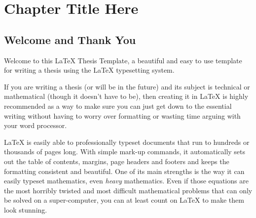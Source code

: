 
\chapter{Chapter Title Here} %
\label{Chapter1} %



\newcommand{\keyword}[1]{\textbf{#1}}
\newcommand{\tabhead}[1]{\textbf{#1}}
\newcommand{\code}[1]{\texttt{#1}}
\newcommand{\file}[1]{\texttt{\bfseries#1}}
\newcommand{\option}[1]{\texttt{\itshape#1}}


\section{Welcome and Thank You}
Welcome to this \LaTeX{} Thesis Template, a beautiful and easy to use template 
for writing a thesis using the \LaTeX{} typesetting system.

If you are writing a thesis (or will be in the future) and its subject is 
technical or mathematical (though it doesn't have to be), then creating it in 
\LaTeX{} is highly recommended as a way to make sure you can just get down to 
the essential writing without having to worry over formatting or wasting time 
arguing with your word processor.

\LaTeX{} is easily able to professionally typeset documents that run to hundreds 
or thousands of pages long. With simple mark-up commands, it automatically sets 
out the table of contents, margins, page headers and footers and keeps the formatting 
consistent and beautiful. One of its main strengths is the way it can easily typeset 
mathematics, even \emph{heavy} mathematics. Even if those equations are the most 
horribly twisted and most difficult mathematical problems that can only be 
solved on a super-computer, you can at least count on \LaTeX{} to make them look 
stunning.

